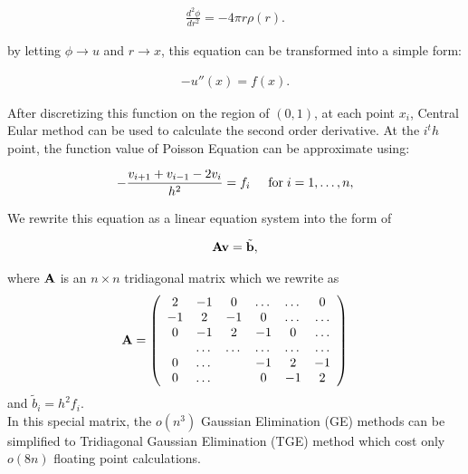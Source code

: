 \documentclass{article}
\begin{document}
\begin{align}
\frac{d^2\phi}{dr^2}= -4\pi r\rho(r).
\end{align}

by letting $\phi\rightarrow u$ and $r\rightarrow x$, this equation can be transformed into a simple form:

\begin{align}
-u''(x) = f(x). 
\end{align}

After discretizing this function on the region of $(0, 1)$, at each point $x_i$, Central Eular method can be used to calculate the second order derivative. At the $i^th$ point, the function value of Poisson Equation can be approximate using:

\begin{align}
   -\frac{v_{i+1}+v_{i-1}-2v_i}{h^2} = f_i  \hspace{0.5cm} \mathrm{for} \hspace{0.1cm} i=1,\dots, n,
\end{align}

We rewrite this equation as a linear equation system into the form of

\begin{align}
{\bf A}{\bf v} = \tilde{{\bf b}},
\end{align}

where ${\bf A}$ is an $n\times n$  tridiagonal matrix which we rewrite as 
\begin{equation}
{\bf A} = \left(\begin{array}{cccccc}
2& -1& 0 &\dots   & \dots &0 \\
-1 & 2 & -1 &0 &\dots &\dots \\
0&-1 &2 & -1 & 0 & \dots \\
& \dots   & \dots &\dots   &\dots & \dots \\
0&\dots   &  &-1 &2& -1 \\
0&\dots    &  & 0  &-1 & 2 \\
\end{array} \right)
\end{equation}
and $\tilde{b}_i=h^2f_i$.\\

In this special matrix, the $o(n^3)$ Gaussian Elimination (GE) methods can be simplified to Tridiagonal Gaussian Elimination (TGE) method which cost only $o(8n)$ floating point calculations.
\end{document}

